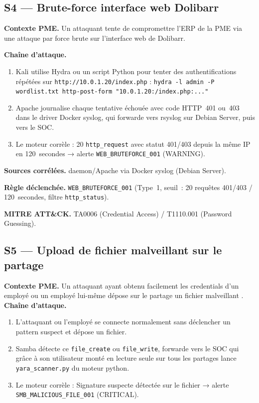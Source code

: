 \documentclass[12pt,a4paper]{article}
\begin{document}
\subsection{S4 --- Brute-force interface web Dolibarr}

\textbf{Contexte PME.} Un attaquant tente de compromettre l'ERP de la
PME via une attaque par force brute sur l'interface web de Dolibarr.

\textbf{Chaîne d'attaque.}
\begin{enumerate}
    \item Kali utilise Hydra ou un script Python pour tenter des
    authentifications répétées sur \texttt{http://10.0.1.20/index.php} :
    \texttt{hydra -l admin -P wordlist.txt http-post-form
    "10.0.1.20:/index.php:..."}
    \item Apache journalise chaque tentative échouée avec code HTTP~401
    ou~403 dans le driver Docker syslog, qui forwarde vers rsyslog sur
    Debian Server, puis vers le SOC.
    \item Le moteur corrèle : 20 \texttt{http\_request} avec statut
    401/403 depuis la même IP en 120~secondes → alerte
    \texttt{WEB\_BRUTEFORCE\_001} (WARNING).
\end{enumerate}

\textbf{Sources corrélées.} daemon/Apache via Docker syslog
(Debian Server).

\textbf{Règle déclenchée.} \texttt{WEB\_BRUTEFORCE\_001} (Type~1,
seuil~: 20 requêtes 401/403 / 120~secondes, filtre \texttt{http\_status}).

\textbf{MITRE ATT\&CK.} TA0006 (Credential Access) / T1110.001
(Password Guessing).

\subsection{S5 --- Upload de fichier malveillant sur le partage}

\textbf{Contexte PME.} Un attaquant ayant obtenu facilement les credentials d'un employé ou un employé lui-même dépose sur le partage un fichier malveillant .
\textbf{Chaîne d'attaque.}
\begin{enumerate}
    \item L'attaquant ou l'employé se connecte normalement sans déclencher un pattern suspect et dépose un fichier.
    \item Samba détecte ce \texttt{file\_create} ou \texttt{file\_write}, forwarde vers  le SOC qui grâce à son utilisateur monté en lecture seule sur tous les partages lance \texttt{yara\_scanner.py} du moteur python.
    \item Le moteur corrèle : Signature suspecte détectée sur le fichier → alerte
    \texttt{SMB\_MALICIOUS\_FILE\_001} (CRITICAL).
\end{enumerate}
\end{document}
